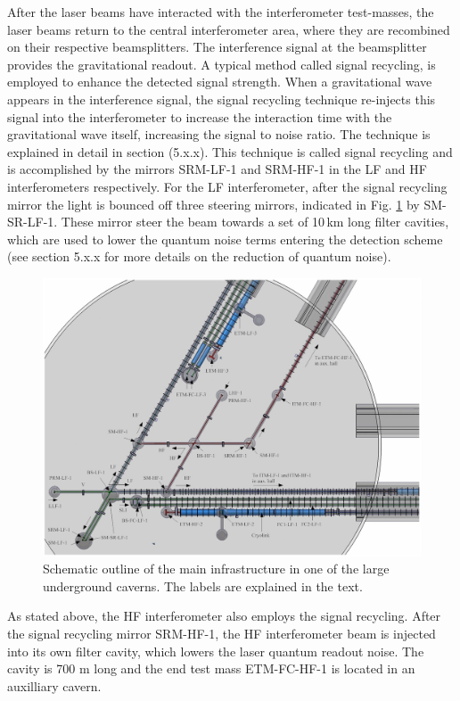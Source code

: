 After the laser beams have interacted with the interferometer test-masses, the laser beams return to the central interferometer area, where they are recombined on their respective beamsplitters. The interference signal at the beamsplitter provides the gravitational readout. A typical method called signal recycling, is employed to enhance the detected signal strength. When a gravitational wave appears in the interference signal, the signal recycling technique re-injects this signal into the interferometer to increase the interaction time with the gravitational wave itself, increasing the signal to noise ratio. The technique is explained in detail in section (5.x.x). This technique is called signal recycling and is accomplished by the mirrors SRM-LF-1 and SRM-HF-1 in the LF and HF interferometers respectively. For the LF interferometer, after the signal recycling mirror the light is bounced off three steering mirrors, indicated in Fig. \ref{infra3} by SM-SR-LF-1. These mirror steer the beam towards a set of 10\,km long filter cavities, which are used to lower the quantum noise terms entering the detection scheme (see section 5.x.x for more details on the reduction of quantum noise). 
\begin{figure}[t!]
	\centering
		\includegraphics[width=17cm]{./Sec_SiteInfra/Figures/infra3.jpg}
		\caption{Schematic outline of the main infrastructure in one of the large underground caverns. The labels are explained in the text.}
	\label{infra3}
\end{figure}

As stated above, the HF interferometer also employs the signal recycling. After the signal recycling mirror SRM-HF-1, the HF interferometer beam is injected into its own filter cavity, which lowers the laser quantum readout noise. The cavity is 700 m long and the end test mass ETM-FC-HF-1 is located in an auxilliary cavern.

